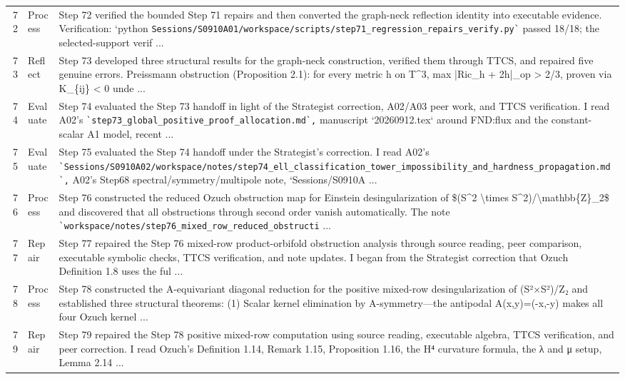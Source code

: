 \documentclass[UTF8,fontset=fandol,zihao=-4]{ctexart}
\begin{document}
\begin{longtable}{r p{} >{\raggedright\arraybackslash}p{}}
72 & Process & Step 72 verified the bounded Step 71 repairs and then converted the graph-neck reflection identity into executable evidence. Verification: `python \nolinkurl{Sessions/S0910A01/workspace/scripts/step71_regression_repairs_verify.py`} passed 18/18; the selected-support verif ...\\
73 & Reflect & Step 73 developed three structural results for the graph-neck construction, verified them through TTCS, and repaired five genuine errors. Preissmann obstruction (Proposition 2.1): for every metric h on T\textasciicircum{}3, max |Ric\_h + 2h|\_op > 2/3, proven via K\_\{ij\} < 0 unde ...\\
74 & Evaluate & Step 74 evaluated the Step 73 handoff in light of the Strategist correction, A02/A03 peer work, and TTCS verification. I read A02's \nolinkurl{`step73_global_positive_proof_allocation.md`,} manuscript `20260912.tex` around FND:flux and the constant-scalar A1 model, recent ...\\
75 & Evaluate & Step 75 evaluated the Step 74 handoff under the Strategist's correction. I read A02's \nolinkurl{`Sessions/S0910A02/workspace/notes/step74_ell_classification_tower_impossibility_and_hardness_propagation.md`,} A02's Step68 spectral/symmetry/multipole note, `Sessions/S0910A ...\\
76 & Process & Step 76 constructed the reduced Ozuch obstruction map for Einstein desingularization of \$(S\textasciicircum{}2 \textbackslash{}times S\textasciicircum{}2)/\textbackslash{}mathbb\{Z\}\_2\$ and discovered that all obstructions through second order vanish automatically. The note \nolinkurl{`workspace/notes/step76_mixed_row_reduced_obstructi} ...\\
77 & Repair & Step 77 repaired the Step 76 mixed-row product-orbifold obstruction analysis through source reading, peer comparison, executable symbolic checks, TTCS verification, and note updates. I began from the Strategist correction that Ozuch Definition 1.8 uses the ful ...\\
78 & Process & Step 78 constructed the A-equivariant diagonal reduction for the positive mixed-row desingularization of (S²×S²)/Z₂ and established three structural theorems: (1) Scalar kernel elimination by A-symmetry—the antipodal A(x,y)=(-x,-y) makes all four Ozuch kernel  ...\\
79 & Repair & Step 79 repaired the Step 78 positive mixed-row computation using source reading, executable algebra, TTCS verification, and peer correction. I read Ozuch's Definition 1.14, Remark 1.15, Proposition 1.16, the H⁴ curvature formula, the λ and μ setup, Lemma 2.14 ...\\

\end{longtable}
\end{document}
